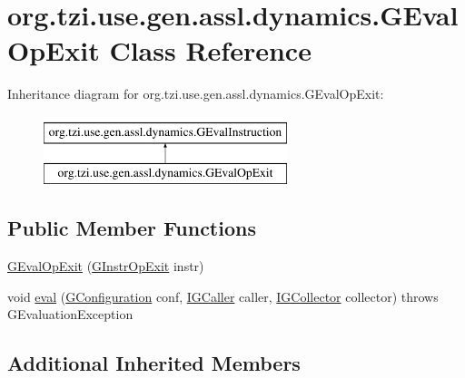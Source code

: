 \hypertarget{classorg_1_1tzi_1_1use_1_1gen_1_1assl_1_1dynamics_1_1_g_eval_op_exit}{\section{org.\-tzi.\-use.\-gen.\-assl.\-dynamics.\-G\-Eval\-Op\-Exit Class Reference}
\label{classorg_1_1tzi_1_1use_1_1gen_1_1assl_1_1dynamics_1_1_g_eval_op_exit}
}
Inheritance diagram for org.\-tzi.\-use.\-gen.\-assl.\-dynamics.\-G\-Eval\-Op\-Exit\-:\begin{figure}[H]
\begin{center}
\leavevmode
\includegraphics[height=2.000000cm]{classorg_1_1tzi_1_1use_1_1gen_1_1assl_1_1dynamics_1_1_g_eval_op_exit}
\end{center}
\end{figure}
\subsection*{Public Member Functions}
\begin{DoxyCompactItemize}
\item 
\hyperlink{classorg_1_1tzi_1_1use_1_1gen_1_1assl_1_1dynamics_1_1_g_eval_op_exit_a6294628f3bc18634328e5dff964537e5}{G\-Eval\-Op\-Exit} (\hyperlink{classorg_1_1tzi_1_1use_1_1gen_1_1assl_1_1statics_1_1_g_instr_op_exit}{G\-Instr\-Op\-Exit} instr)
\item 
void \hyperlink{classorg_1_1tzi_1_1use_1_1gen_1_1assl_1_1dynamics_1_1_g_eval_op_exit_a4cd96cf5dc0ec88e906a7a649d56d1ed}{eval} (\hyperlink{classorg_1_1tzi_1_1use_1_1gen_1_1assl_1_1dynamics_1_1_g_configuration}{G\-Configuration} conf, \hyperlink{interfaceorg_1_1tzi_1_1use_1_1gen_1_1assl_1_1dynamics_1_1_i_g_caller}{I\-G\-Caller} caller, \hyperlink{interfaceorg_1_1tzi_1_1use_1_1gen_1_1assl_1_1dynamics_1_1_i_g_collector}{I\-G\-Collector} collector)  throws G\-Evaluation\-Exception 
\end{DoxyCompactItemize}
\subsection*{Additional Inherited Members}


